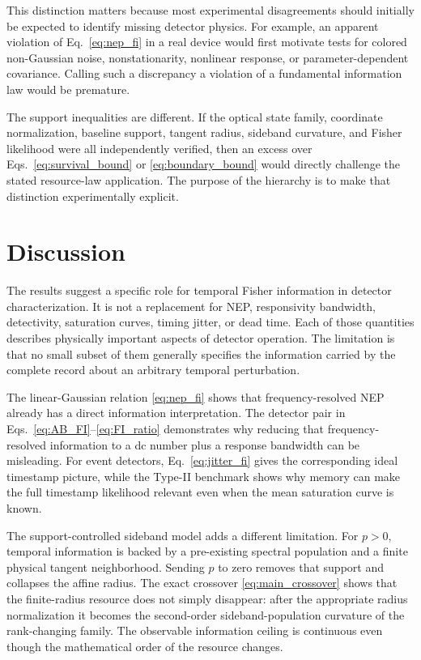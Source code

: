 \documentclass[aps,pra,reprint,superscriptaddress,longbibliography]{revtex4-2}
\begin{document}
This distinction matters because most experimental disagreements should initially be expected to identify missing detector physics. For example, an apparent violation of Eq.~\eqref{eq:nep_fi} in a real device would first motivate tests for colored non-Gaussian noise, nonstationarity, nonlinear response, or parameter-dependent covariance. Calling such a discrepancy a violation of a fundamental information law would be premature.

The support inequalities are different. If the optical state family, coordinate normalization, baseline support, tangent radius, sideband curvature, and Fisher likelihood were all independently verified, then an excess over Eqs.~\eqref{eq:survival_bound} or \eqref{eq:boundary_bound} would directly challenge the stated resource-law application. The purpose of the hierarchy is to make that distinction experimentally explicit.

\section{Discussion}

The results suggest a specific role for temporal Fisher information in detector characterization. It is not a replacement for NEP, responsivity bandwidth, detectivity, saturation curves, timing jitter, or dead time. Each of those quantities describes physically important aspects of detector operation. The limitation is that no small subset of them generally specifies the information carried by the complete record about an arbitrary temporal perturbation.

The linear-Gaussian relation \eqref{eq:nep_fi} shows that frequency-resolved NEP already has a direct information interpretation. The detector pair in Eqs.~\eqref{eq:AB_FI}--\eqref{eq:FI_ratio} demonstrates why reducing that frequency-resolved information to a dc number plus a response bandwidth can be misleading. For event detectors, Eq.~\eqref{eq:jitter_fi} gives the corresponding ideal timestamp picture, while the Type-II benchmark shows why memory can make the full timestamp likelihood relevant even when the mean saturation curve is known.

The support-controlled sideband model adds a different limitation. For $p>0$, temporal information is backed by a pre-existing spectral population and a finite physical tangent neighborhood. Sending $p$ to zero removes that support and collapses the affine radius. The exact crossover \eqref{eq:main_crossover} shows that the finite-radius resource does not simply disappear: after the appropriate radius normalization it becomes the second-order sideband-population curvature of the rank-changing family. The observable information ceiling is continuous even though the mathematical order of the resource changes.
\end{document}
